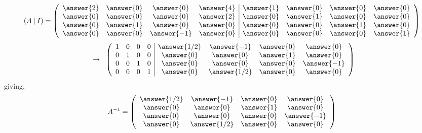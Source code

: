 \documentclass{ximera}
\begin{document}
\begin{exercise}
\begin{exercise}
\begin{prompt}
\[(A \hspace{.08cm}| \hspace{.08cm} I)= \left(\begin{array}{cccc|cccc}
\answer{2} & \answer{0} & \answer{0}& \answer{4} & \answer{1} & \answer{0} &\answer{0} & \answer{0}\\
\answer{0} & \answer{0} & \answer{0}& \answer{2} & \answer{0} & \answer{1} &\answer{0} & \answer{0}\\
\answer{0} & \answer{1} & \answer{0}& \answer{0} & \answer{0} & \answer{0} &\answer{1} & \answer{0}\\
\answer{0} & \answer{0} & \answer{-1}& \answer{0} & \answer{0} & \answer{0} &\answer{0} & \answer{1}
\end{array}\right)
\]
\[
\hspace{.2cm} \rightarrow \hspace{.2cm}
\left(\begin{array}{cccc|cccc}
1 & 0 & 0& 0 & \answer{1/2} & \answer{-1} &\answer{0} & \answer{0}\\
0 & 1 & 0& 0 & \answer{0} & \answer{0} &\answer{1} & \answer{0}\\
0 & 0 & 1& 0 & \answer{0} & \answer{0} &\answer{0} & \answer{-1}\\
0 & 0 & 0& 1 & \answer{0} & \answer{1/2} &\answer{0} & \answer{0}
\end{array}\right)
\]
giving,
\[A^{-1} = \left(\begin{array}{cccc}
\answer{1/2} & \answer{-1} &\answer{0} & \answer{0}\\
 \answer{0} & \answer{0} &\answer{1} & \answer{0}\\
 \answer{0} & \answer{0} &\answer{0} & \answer{-1}\\
 \answer{0} & \answer{1/2} &\answer{0} & \answer{0}
\end{array}\right)
\]


\end{prompt}
\end{exercise}
\end{exercise}
\end{document}
